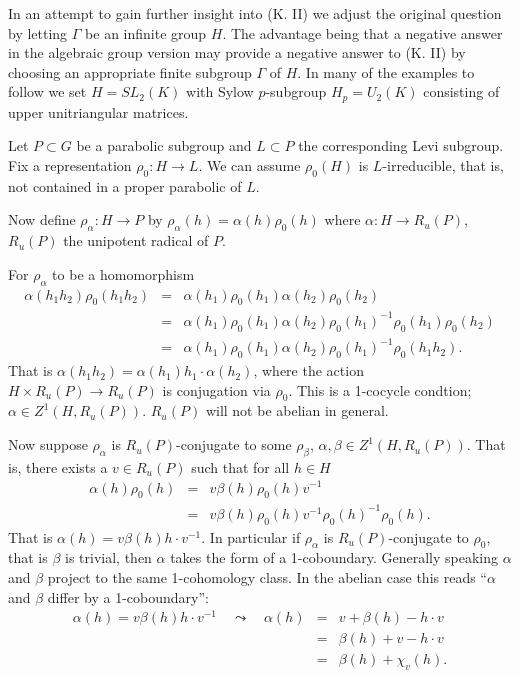 In an attempt to gain further insight into (K. II) we adjust the original question by letting $\Gamma$ be an infinite group $H$. The advantage being that a negative answer in the algebraic group version may provide a negative answer to (K. II) by choosing an appropriate finite subgroup $\Gamma$ of $H$. In many of the examples to follow we set $H = SL_2(K)$ with Sylow $p$-subgroup $H_p = U_2(K)$ consisting of upper unitriangular matrices. 

Let $P \subset G$ be a parabolic subgroup and $L \subset P$ the corresponding Levi subgroup. Fix a representation $\rho_0:H\rightarrow L$. We can assume $\rho_0(H)$ is $L$-irreducible, that is, not contained in a proper parabolic of $L$. 

Now define $\rho_\alpha:H \rightarrow P$ by $\rho_\alpha(h) = \alpha(h)\rho_0(h)$ where $\alpha:H\rightarrow R_u(P)$, $R_u(P)$ the unipotent radical of $P$. 

For $\rho_\alpha$ to be a homomorphism
\begin{eqnarray*}
	\alpha(h_1h_2)\rho_0(h_1h_2) &=& \alpha(h_1)\rho_0(h_1)\alpha(h_2)\rho_0(h_2) \\
	 &=& \alpha(h_1)\rho_0(h_1)\alpha(h_2)\rho_0(h_1)^{-1}\rho_0(h_1)\rho_0(h_2) \\
	 &=& \alpha(h_1)\rho_0(h_1)\alpha(h_2)\rho_0(h_1)^{-1}\rho_0(h_1h_2).
\end{eqnarray*}
That is $\alpha(h_1h_2) = \alpha(h_1) h_1\cdot\alpha(h_2)$, where the action $H \times R_u(P) \rightarrow R_u(P)$ is conjugation via $\rho_0$. This is a 1-cocycle condtion; $\alpha\in Z^1(H, R_u(P))$. $R_u(P)$ will not be abelian in general.

Now suppose $\rho_\alpha$ is $R_u(P)$-conjugate to some $\rho_\beta$, $\alpha, \beta \in Z^1(H, R_u(P))$. That is, there exists a $v \in R_u(P)$ such that for all $h\in H$
\begin{eqnarray*}
	\alpha(h)\rho_0(h) &=& v\beta(h)\rho_0(h)v^{-1} \\
	&=& v\beta(h)\rho_0(h)v^{-1}\rho_0(h)^{-1}\rho_0(h).
\end{eqnarray*}
That is $\alpha(h) = v\beta(h)h\cdot v^{-1}$. In particular if $\rho_\alpha$ is $R_u(P)$-conjugate to $\rho_0$, that is $\beta$ is trivial, then $\alpha$ takes the form of a 1-coboundary. Generally speaking $\alpha$ and $\beta$ project to the same 1-cohomology class. In the abelian case this reads ``$\alpha$ and $\beta$ differ by a 1-coboundary'':
\begin{eqnarray*}
	\alpha(h) = v\beta(h)h\cdot v^{-1} \quad\leadsto \quad\alpha(h) &=& v + \beta(h) - h\cdot v \\
	&=& \beta(h) + v - h\cdot v \\
	&=& \beta(h) + \chi_v(h).
\end{eqnarray*}

